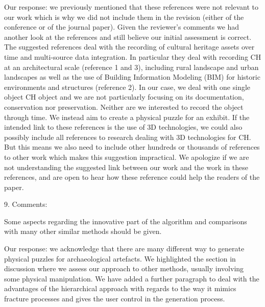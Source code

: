 \documentclass[acmlarge,screen,dvipsnames]{acmart}
\begin{document}
Our response: we previously mentioned that these references were not relevant to our work which is why we did not include them in the revision (either of the conference or of the journal paper). Given the reviewer's comments we  had another look at the references and still believe our initial assessment is correct. The suggested references deal with the recording of cultural heritage assets over time and multi-source data integration. In particular they deal with recording CH at an architectural scale (reference 1 and 3), including rural landscape and urban landscapes as well as the use of Building Information Modeling (BIM) for historic environments and structures (reference 2). In our case, we deal with one single object CH object and we are not particularly focusing on its documentation, conservation nor preservation. Neither are we interested to record the object through time. We instead aim to create a physical puzzle for an exhibit. If the intended link to these references is the use of 3D technologies, we could also possibly include all references to research dealing with 3D technologies for CH. But this means we also need to include other hundreds or thousands of references to other work which makes this suggestion impractical. We apologize if we are not understanding the suggested link between our work and the work in these references, and are open to hear how these reference could help the readers of the paper.

\greenEnd


9. Comments:

Some aspects regarding the innovative part of the algorithm and comparisons with many other similar methods should be given.

\greenBegin

Our response: we acknowledge that there are many different way to generate physical puzzles for archaeological artefacts. We highlighted the section in discussion where we assess our approach to other methods, usually involving some physical manipulation.  We have added a further paragraph to deal with the advantages of the hierarchical approach with regards to the way it mimics fracture processes and gives the user control in the generation process.

\greenEnd




\newpage
%
\maketitle
\end{document}
